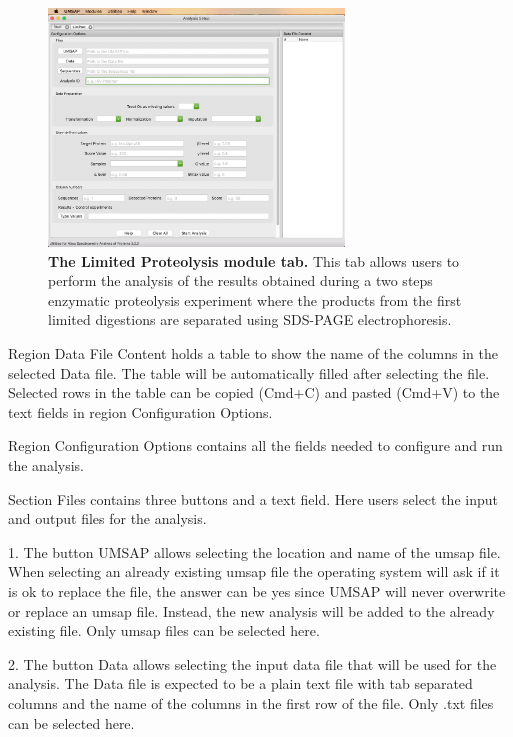 \begin{figure}[h]
    \centering
    \includegraphics[width=0.7\textwidth]{./IMAGES/MOD-LIMPROT/limprot-mod.jpg}
    \caption[The Limited Proteolysis module tab]{\textbf{The Limited Proteolysis
    module tab.} This tab allows users to perform the analysis of the results obtained
    during a two steps enzymatic proteolysis experiment where the products from the
    first limited digestions are separated using SDS-PAGE electrophoresis.}
    \label{fig:limprotTab}
    \vspace{-5pt}
\end{figure}

Region Data File Content holds a table to show the name of the columns in
the selected Data file. The table will be automatically filled after selecting the
file. Selected rows in the table can be copied (Cmd+C) and pasted (Cmd+V) to the
text fields in region Configuration Options.

Region Configuration Options contains all the fields needed to configure and
run the analysis.

Section Files contains three buttons and a text field. Here users select the input
and output files for the analysis.

\num{1}. The button UMSAP allows selecting the location
and name of the umsap file. When selecting an already existing umsap file the operating
system will ask if it is ok to replace the file, the answer can be yes since UMSAP
will never overwrite or replace an umsap file. Instead, the new analysis will be
added to the already existing file. Only umsap files can be selected here.

\num{2}. The button Data allows selecting the input
data file that will be used for the analysis. The Data file is expected to be a
plain text file with tab separated columns and the name of the columns in the first
row of the file. Only .txt files can be selected here.

